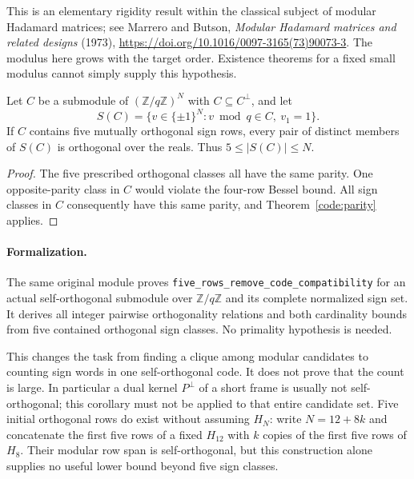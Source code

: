 This is an elementary rigidity result within the classical subject of modular Hadamard matrices; see Marrero and Butson, \emph{Modular Hadamard matrices and related designs} (1973),
\url{https://doi.org/10.1016/0097-3165(73)90073-3}.
The modulus here grows with the target order. Existence theorems
for a fixed small modulus cannot simply supply this hypothesis.

\begin{corollary}\label{code:five}
Let $C$ be a submodule of $(\mathbb Z/q\mathbb Z)^N$ with
$C\subseteq C^\perp$, and let
\[
 S(C)=\{v\in\{\pm1\}^N:v\bmod q\in C,\ v_1=1\}.
\]
If $C$ contains five mutually orthogonal sign rows, every pair of
distinct members of $S(C)$ is orthogonal over the reals.
Thus $5\le |S(C)|\le N$.
\end{corollary}
\begin{proof}
The five prescribed orthogonal classes all have the same parity.
One opposite-parity class in $C$ would violate the four-row Bessel
bound. All sign classes in $C$ consequently have this same parity,
and Theorem~\ref{code:parity} applies.
\end{proof}

\paragraph{Formalization.}
The same original module proves
\texttt{five\_\allowbreak rows\_\allowbreak remove\_\allowbreak code\_\allowbreak compatibility}
for an actual self-orthogonal submodule over $\mathbb Z/q\mathbb Z$
and its complete normalized sign set. It derives all integer pairwise
orthogonality relations and both cardinality bounds from five contained
orthogonal sign classes. No primality hypothesis is needed.

This changes the task from finding a clique among modular candidates
to counting sign words in one self-orthogonal code. It does not prove
that the count is large. In particular a dual kernel $P^\perp$ of a
short frame is usually not self-orthogonal; this corollary must not
be applied to that entire candidate set.
Five initial orthogonal rows do exist without assuming $H_N$:
write $N=12+8k$ and concatenate the first five rows of a fixed
$H_{12}$ with $k$ copies of the first five rows of $H_8$.
Their modular row span is self-orthogonal, but this construction
alone supplies no useful lower bound beyond five sign classes.

